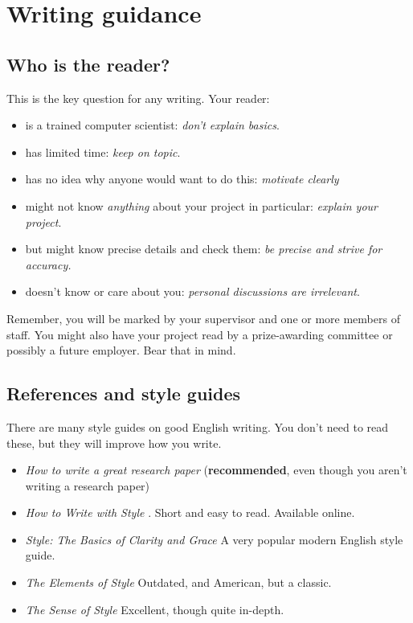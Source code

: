 \documentclass{l4proj}
\begin{document}
\section{Writing guidance}
\subsection{Who is the reader?}

This is the key question for any writing. Your reader:

\begin{itemize}
    \item
    is a trained computer scientist: \emph{don't explain basics}.
    \item
    has limited time: \emph{keep on topic}.
    \item
    has no idea why anyone would want to do this: \emph{motivate clearly}
    \item
    might not know \emph{anything} about your project in particular:
    \emph{explain your project}.
    \item
    but might know precise details and check them: \emph{be precise and
    strive for accuracy.}
    \item
    doesn't know or care about you: \emph{personal discussions are
    irrelevant}.
\end{itemize}

Remember, you will be marked by your supervisor and one or more members
of staff. You might also have your project read by a prize-awarding
committee or possibly a future employer. Bear that in mind.

\subsection{References and style guides}
There are many style guides on good English writing. You don't need to
read these, but they will improve how you write.

\begin{itemize}
    \item
    \emph{How to write a great research paper} \cite{Pey17} (\textbf{recommended}, even though you aren't writing a research paper)
    \item
    \emph{How to Write with Style} \cite{Von80}. Short and easy to read. Available online.
    \item
    \emph{Style: The Basics of Clarity and Grace} \cite{Wil09} A very popular modern English style guide.
    \item
    \emph{The Elements of Style} \cite{StrWhi07} Outdated, and American, but a classic.
    \item
    \emph{The Sense of Style} \cite{Pin15} Excellent, though quite in-depth.
\end{itemize}
\end{document}
